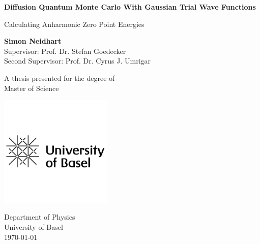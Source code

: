 \documentclass [12pt]{report}
\begin{document}
\begin{titlepage}
    \begin{center}
            
        \Huge
        \textbf{Diffusion Quantum Monte Carlo With Gaussian Trial Wave Functions}
            
        \vspace{0.5cm}
        \LARGE
        Calculating Anharmonic Zero Point Energies
            
        \vspace{1.5cm}
        
        \large
            
        \textbf{Simon Neidhart}\\
        \vspace{0.5cm}
        Supervisor: Prof. Dr. Stefan Goedecker\\
        Second Supervisor: Prof. Dr. Cyrus J. Umrigar
            
        \vfill
            
        A thesis presented for the degree of\\
        Master of Science
            
            
        \includegraphics[width=0.4\textwidth]{uni-basel-logo.png}
            
        Department of Physics\\
        University of Basel\\
        \today
            
    \end{center}
\end{titlepage}
\tableofcontents
\newpage
\end{document}
